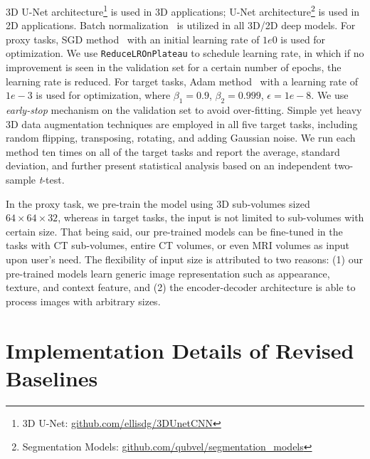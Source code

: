 3D U-Net architecture\footnote{\label{foot:3dunet}3D U-Net: \href{https://github.com/ellisdg/3DUnetCNN}{github.com/ellisdg/3DUnetCNN}} is used in 3D applications; U-Net architecture\footnote{\label{foot:densenet121}Segmentation Models: \href{https://github.com/qubvel/segmentation_models}{github.com/qubvel/segmentation\_models}} is used in 2D applications. Batch normalization~\citep{ioffe2015batch} is utilized in all 3D/2D deep models. For proxy tasks, SGD method~\citep{zhang2004solving} with an initial learning rate of $1e0$ is used for optimization. We use \texttt{ReduceLROnPlateau} to schedule learning rate, in which if no improvement is seen in the validation set for a certain number of epochs, the learning rate is reduced. For target tasks, Adam method~\citep{kinga2015method} with a learning rate of $1e-3$ is used for optimization, where $\beta_1=0.9$, $\beta_2=0.999$, $\epsilon=1e-8$. We use \textit{early-stop} mechanism on the validation set to avoid over-fitting. Simple yet heavy 3D data augmentation techniques are employed in all five target tasks, including random flipping, transposing, rotating, and adding Gaussian noise. We run each method ten times on all of the target tasks and report the average, standard deviation, and further present statistical analysis based on an independent two-sample \textit{t}-test.

In the proxy task, we pre-train the model using 3D sub-volumes sized $64\times 64\times 32$, whereas in target tasks, the input is not limited to sub-volumes with certain size. That being said, our pre-trained models can be fine-tuned in the tasks with CT sub-volumes, entire CT volumes, or even MRI volumes as input upon user's need. The flexibility of input size is attributed to two reasons: (1) our pre-trained models learn generic image representation such as appearance, texture, and context feature, and (2) the encoder-decoder architecture is able to process images with arbitrary sizes.

\section*{Implementation Details of Revised Baselines}
\label{sec:baseline_implementation_appendix}


